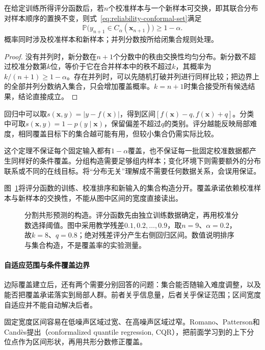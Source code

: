 \begin{theorem}[分割共形预测的边际覆盖]
\label{thm:reliability-split-conformal}
在给定训练所得评分函数后，若$n$个校准样本与一个新样本可交换，即其联合分布对样本顺序的置换不变，则式~\eqref{eq:reliability-conformal-set}满足
\[
 \mathbb P\bigl(y_{n+1}\in C_\alpha(\bm{x}_{n+1})\bigr)
 \geq1-\alpha.
\]
概率同时涉及校准样本和新样本；并列分数按所给闭集合规则处理。
\end{theorem}
\begin{proof}
没有并列时，新分数在$n+1$个分数中的秩由交换性均匀分布。新分数不超过校准分数第$k$位，等价于它在合并样本中的秩不超过$k$，其概率为$k/(n+1)\geq1-\alpha$。存在并列时，可以先随机打破并列进行同样比较；把边界上的全部并列分数纳入集合，只会增加覆盖概率。$k=n+1$时集合接受所有候选结果，结论直接成立。
\end{proof}

回归中可以取$s(\bm{x},y)=|y-f(\bm{x})|$，得到区间$[f(\bm{x})-q,f(\bm{x})+q]$。分类中可取$s(\bm{x},y)=1-p(y\mid\bm{x})$，保留偏差不超过$q$的类别。评分越能反映局部难度，相同覆盖目标下的集合越可能有用，但较小集合仍需实际比较。

这个定理不保证每个固定输入都有$1-\alpha$覆盖，也不保证每一批固定校准数据都产生同样好的条件覆盖。分组构造需要足够组内样本；变化环境下则需要额外的分布联系或不同的在线目标。将“分布无关”理解成不需要任何数据关系，会误用保证。

图~\ref{fig:trust-conformal-construction}将评分函数的训练、校准排序和新输入的集合构造分开。覆盖承诺依赖校准样本与新样本的交换性，不能从图中区间的宽度直接读出。

\begin{figure}[htbp]
  \centering
  
  \caption{分割共形预测的构造。评分函数先由独立训练数据确定，再用校准分数选择阈值。图中采用教学残差$0.1,0.2,\ldots,0.9$，取$n=9$、$\alpha=0.2$，故$k=8$、$q=0.8$；绝对残差评分产生右侧回归区间。数值说明排序与集合构造，不是覆盖率的实验测量。}
  \label{fig:trust-conformal-construction}
\end{figure}

\paragraph{自适应范围与条件覆盖边界}

边际覆盖建立后，还有两个需要分别回答的问题：集合能否随输入难度调整，以及能否把覆盖承诺落实到局部人群。前者关乎信息量，后者关乎保证范围；区间宽度自适应并不能自动解决后者。

固定宽度区间容易在低噪声区域过宽、在高噪声区域过窄。Romano、Patterson和Candès提出（conformalized quantile regression, CQR），把前面学习到的上下分位点作为区间形状，再用共形分数修正覆盖。

